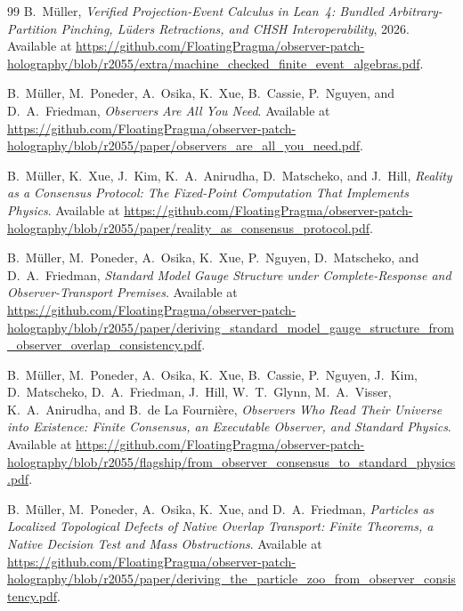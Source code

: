 \documentclass[11pt]{article}
\theoremstyle{remark}
\theoremstyle{plain}
\begin{document}
\begin{thebibliography}{99}
B.\ M\"uller,
\emph{Verified Projection-Event Calculus in Lean~4: Bundled Arbitrary-Partition Pinching,
L\"uders Retractions, and CHSH Interoperability},
2026.\\
Available at \url{https://github.com/FloatingPragma/observer-patch-holography/blob/r2055/extra/machine_checked_finite_event_algebras.pdf}.

B.\ M\"uller, M.\ Poneder, A.\ Osika, K.\ Xue, B.\ Cassie, P.\ Nguyen, and D.\ A.\ Friedman,
\emph{Observers Are All You Need}.
Available at \url{https://github.com/FloatingPragma/observer-patch-holography/blob/r2055/paper/observers_are_all_you_need.pdf}.

B.\ M\"uller, K.\ Xue, J.\ Kim, K.\ A.\ Anirudha, D.\ Matscheko, and J.\ Hill,
\emph{Reality as a Consensus Protocol: The Fixed-Point Computation That Implements Physics}.
Available at \url{https://github.com/FloatingPragma/observer-patch-holography/blob/r2055/paper/reality_as_consensus_protocol.pdf}.

B.\ M\"uller, M.\ Poneder, A.\ Osika, K.\ Xue, P.\ Nguyen, D.\ Matscheko, and D.\ A.\ Friedman,
\emph{Standard Model Gauge Structure under Complete-Response and Observer-Transport Premises}.
Available at \url{https://github.com/FloatingPragma/observer-patch-holography/blob/r2055/paper/deriving_standard_model_gauge_structure_from_observer_overlap_consistency.pdf}.

B.\ M\"uller, M.\ Poneder, A.\ Osika, K.\ Xue, B.\ Cassie, P.\ Nguyen, J.\ Kim, D.\ Matscheko, D.\ A.\ Friedman, J.\ Hill, W.\ T.\ Glynn, M.\ A.\ Visser, K.\ A.\ Anirudha, and B.\ de La Fourni\`ere,
\emph{Observers Who Read Their Universe into Existence: Finite Consensus, an Executable Observer, and Standard Physics}.
Available at \url{https://github.com/FloatingPragma/observer-patch-holography/blob/r2055/flagship/from_observer_consensus_to_standard_physics.pdf}.

B.\ M\"uller, M.\ Poneder, A.\ Osika, K.\ Xue, and D.\ A.\ Friedman,
\emph{Particles as Localized Topological Defects of Native Overlap Transport: Finite Theorems, a Native Decision Test and Mass Obstructions}.
Available at \url{https://github.com/FloatingPragma/observer-patch-holography/blob/r2055/paper/deriving_the_particle_zoo_from_observer_consistency.pdf}.


\end{thebibliography}
\end{document}
